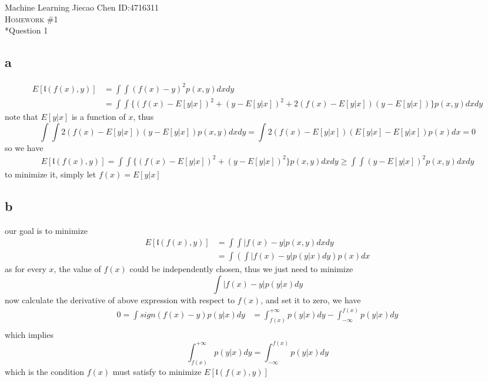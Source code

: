 \documentclass[12pt]{amsart}
\makeatletter
\renewcommand{\section}{\@startsection{section}{1}{0mm}
{-\baselineskip}{0.5\baselineskip}{\bf\leftline}}
\makeatother
\begin{document}
\noindent Machine Learning \hfill Jiecao Chen \hfill ID:4716311 \\
\textsc{Homework \#1}\\

\section*{Question 1} 
\subsection*{a}
\begin{align*}
	E[\mathfrak{l}(f(x), y)] 
	&= \int\int (f(x) - y)^2 p(x, y) dxdy\\
	&= \int\int
		\{ (f(x) - E[y|x])^2 + (y - E[y|x])^2 +
	 	 2(f(x) - E[y|x]) (y - E[y|x]) \} p(x, y) dxdy					
\end{align*}
note that $E[y|x]$ is a function of $x$, thus
$$
	\int\int 2(f(x) - E[y|x]) (y - E[y|x]) p(x, y) dxdy	=
	\int 2(f(x) - E[y|x]) (E[y|x] - E[y|x]) p(x) dx =
	0	
$$
so we have 
\begin{align*}
	E[\mathfrak{l}(f(x), y)]  = 
	\int\int
		\{ (f(x) - E[y|x])^2 + (y - E[y|x])^2
	 	\} p(x, y) dxdy	\geq \int\int  (y - E[y|x])^2 p(x, y) dxdy
\end{align*}
to minimize it, simply let $f(x) = E[y|x]$

\subsection*{b}
our goal is to minimize
\begin{align*}
	E[\mathfrak{l}(f(x), y)]  
	&=	\int\int |f(x) - y| p(x, y) dx dy\\
	&=	\int (\int |f(x) - y| p(y|x)	dy) p(x)dx	
\end{align*}
as for every $x$, the value of $f(x)$ could be independently chosen, 
thus we just need to minimize
$$
	\int |f(x) - y| p(y|x)	dy
$$
now calculate the derivative of above expression with respect to $f(x)$, and set
it to zero, we have
\begin{align*}
	0 = \int sign( f(x) - y ) p(y|x) dy 
	&= \int_{f(x)}^{+\infty} p(y|x) dy - \int^{f(x)}_{-\infty} p(y|x) dy\\	
\end{align*}
which implies 
$$
	\int_{f(x)}^{+\infty} p(y|x) dy = \int^{f(x)}_{-\infty} p(y|x) dy
$$
which is the condition $f(x)$ must satisfy to minimize $E[\mathfrak{l}(f(x), y)]$
\end{document}
